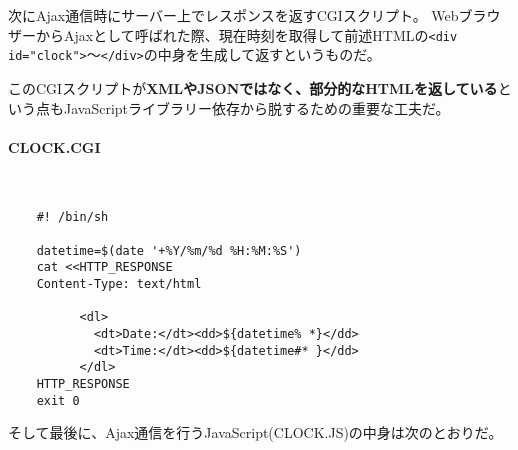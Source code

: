 次にAjax通信時にサーバー上でレスポンスを返すCGIスクリプト。
WebブラウザーからAjaxとして呼ばれた際、現在時刻を取得して前述HTMLの\verb|<div id="clock">|～\verb|</div>|の中身を生成して返すというものだ。

このCGIスクリプトが\textbf{XMLやJSONではなく、部分的なHTMLを返している}という点もJavaScriptライブラリー依存から脱するための重要な工夫だ。
\paragraph{CLOCK.CGI} 　\\
\begin{frameboxit}{160.0mm}
\begin{verbatim}
	#! /bin/sh

	datetime=$(date '+%Y/%m/%d %H:%M:%S')
	cat <<HTTP_RESPONSE
	Content-Type: text/html

	      <dl>
	        <dt>Date:</dt><dd>${datetime% *}</dd>
	        <dt>Time:</dt><dd>${datetime#* }</dd>
	      </dl>
	HTTP_RESPONSE
	exit 0
\end{verbatim}
\end{frameboxit}

そして最後に、Ajax通信を行うJavaScript(CLOCK.JS)の中身は次のとおりだ。
